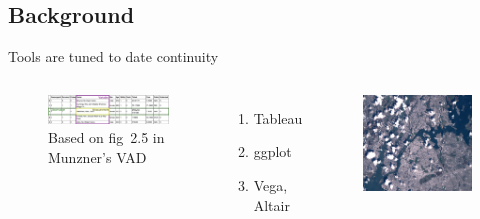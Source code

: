 \documentclass[xcolor={dvipsnames}, handout]{beamer}
\begin{document}
\subsection{Background}
\begin{frame}{Tools are tuned to date continuity \cite{HeerSoftware2006}}
    \begin{columns}
            \begin{figure}
                \includegraphics[width=1\textwidth]{figures/intro/data_formatting.png}
                \caption{Based on fig~2.5 in Munzner's VAD\cite{munznerVisualizationAnalysisDesign2014}}
            \end{figure}
            \begin{enumerate}
                \item Tableau\cite{StoltePolaris2002,hanrahanVizQL2006,MackinlayShowme2007}
                \item ggplot\cite{wickhamGgplot2ElegantGraphics2016a}
                \item Vega\cite{satyanarayanDeclarativeInteractionDesign2014}, Altair\cite{vanderplasAltairInteractiveStatistical2018}
            \end{enumerate}
            \pause
            \begin{figure}
                \includegraphics[width=1\textwidth]{figures/intro/landsat.png}

\end{figure}
\end{columns}
\end{frame}
\end{document}
